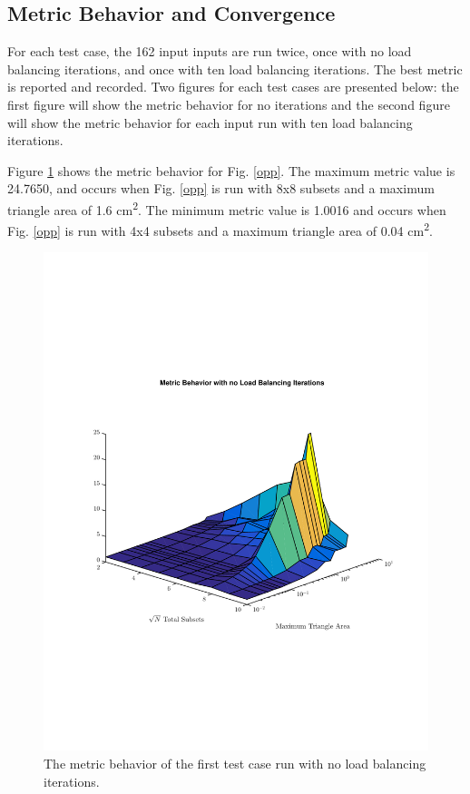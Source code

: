 \documentclass{anstrans}
\begin{document}
\subsection{Metric Behavior and Convergence}

For each test case, the 162 input inputs are run twice, once with no load balancing iterations, and once with ten load balancing iterations. The best metric is reported and recorded. Two figures for each test cases are presented below: the first figure will show the metric behavior for no iterations and the second figure will show the metric behavior for each input run with ten load balancing iterations.

Figure \ref{oppnoiter} shows the metric behavior for Fig. \ref{opp}. The maximum metric value is 24.7650, and occurs when Fig. \ref{opp} is run with 8x8 subsets and a maximum triangle area of 1.6 cm\textsuperscript{2}. The minimum metric value is 1.0016 and occurs when Fig. \ref{opp} is run with 4x4 subsets and a maximum triangle area of 0.04 cm\textsuperscript{2}. 

\begin{figure}[H]
\centering
\includegraphics[scale=0.5, trim = 0cm 8cm 0cm 7cm,clip]{figures/OppNoIter.pdf}
\caption{The metric behavior of the first test case run with no load balancing iterations.}
\label{oppnoiter}
\end{figure}
\end{document}
